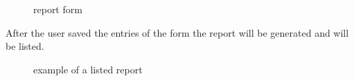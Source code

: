 \begin{figure}[!h]
  \centering
  \caption{report form}
  \label{fig:report_form}
\end{figure}

\pagebreak

After the user saved the entries of the form the report will be generated and will be listed.

\begin{figure}[!h]
  \centering
  \caption{example of a listed report}
  \label{fig:report_list}
\end{figure}


